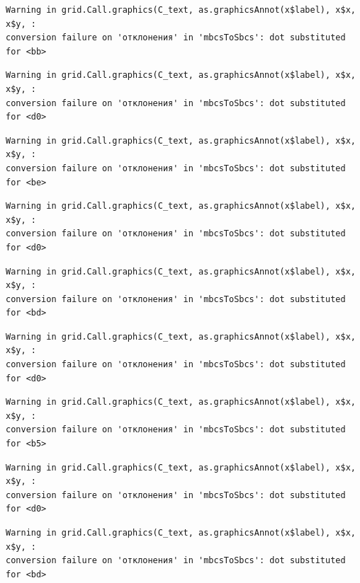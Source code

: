 \documentclass[
  letterpaper,
  DIV=11,
  numbers=noendperiod]{scrreprt}
\theoremstyle{definition}
\theoremstyle{remark}
\begin{document}
\begin{verbatim}
Warning in grid.Call.graphics(C_text, as.graphicsAnnot(x$label), x$x, x$y, :
conversion failure on 'отклонения' in 'mbcsToSbcs': dot substituted for <bb>
\end{verbatim}

\begin{verbatim}
Warning in grid.Call.graphics(C_text, as.graphicsAnnot(x$label), x$x, x$y, :
conversion failure on 'отклонения' in 'mbcsToSbcs': dot substituted for <d0>
\end{verbatim}

\begin{verbatim}
Warning in grid.Call.graphics(C_text, as.graphicsAnnot(x$label), x$x, x$y, :
conversion failure on 'отклонения' in 'mbcsToSbcs': dot substituted for <be>
\end{verbatim}

\begin{verbatim}
Warning in grid.Call.graphics(C_text, as.graphicsAnnot(x$label), x$x, x$y, :
conversion failure on 'отклонения' in 'mbcsToSbcs': dot substituted for <d0>
\end{verbatim}

\begin{verbatim}
Warning in grid.Call.graphics(C_text, as.graphicsAnnot(x$label), x$x, x$y, :
conversion failure on 'отклонения' in 'mbcsToSbcs': dot substituted for <bd>
\end{verbatim}

\begin{verbatim}
Warning in grid.Call.graphics(C_text, as.graphicsAnnot(x$label), x$x, x$y, :
conversion failure on 'отклонения' in 'mbcsToSbcs': dot substituted for <d0>
\end{verbatim}

\begin{verbatim}
Warning in grid.Call.graphics(C_text, as.graphicsAnnot(x$label), x$x, x$y, :
conversion failure on 'отклонения' in 'mbcsToSbcs': dot substituted for <b5>
\end{verbatim}

\begin{verbatim}
Warning in grid.Call.graphics(C_text, as.graphicsAnnot(x$label), x$x, x$y, :
conversion failure on 'отклонения' in 'mbcsToSbcs': dot substituted for <d0>
\end{verbatim}

\begin{verbatim}
Warning in grid.Call.graphics(C_text, as.graphicsAnnot(x$label), x$x, x$y, :
conversion failure on 'отклонения' in 'mbcsToSbcs': dot substituted for <bd>
\end{verbatim}
\end{document}
